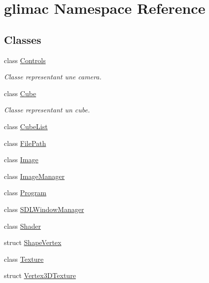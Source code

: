 \hypertarget{namespaceglimac}{}\section{glimac Namespace Reference}
\label{namespaceglimac}
\subsection*{Classes}
\begin{DoxyCompactItemize}
\item 
class \hyperlink{classglimac_1_1Controls}{Controls}
\begin{DoxyCompactList}\small\item\em Classe representant une camera. \end{DoxyCompactList}\item 
class \hyperlink{classglimac_1_1Cube}{Cube}
\begin{DoxyCompactList}\small\item\em Classe representant un cube. \end{DoxyCompactList}\item 
class \hyperlink{classglimac_1_1CubeList}{Cube\+List}
\item 
class \hyperlink{classglimac_1_1FilePath}{File\+Path}
\item 
class \hyperlink{classglimac_1_1Image}{Image}
\item 
class \hyperlink{classglimac_1_1ImageManager}{Image\+Manager}
\item 
class \hyperlink{classglimac_1_1Program}{Program}
\item 
class \hyperlink{classglimac_1_1SDLWindowManager}{S\+D\+L\+Window\+Manager}
\item 
class \hyperlink{classglimac_1_1Shader}{Shader}
\item 
struct \hyperlink{structglimac_1_1ShapeVertex}{Shape\+Vertex}
\item 
class \hyperlink{classglimac_1_1Texture}{Texture}
\item 
struct \hyperlink{structglimac_1_1Vertex3DTexture}{Vertex3\+D\+Texture}
\end{DoxyCompactItemize}
